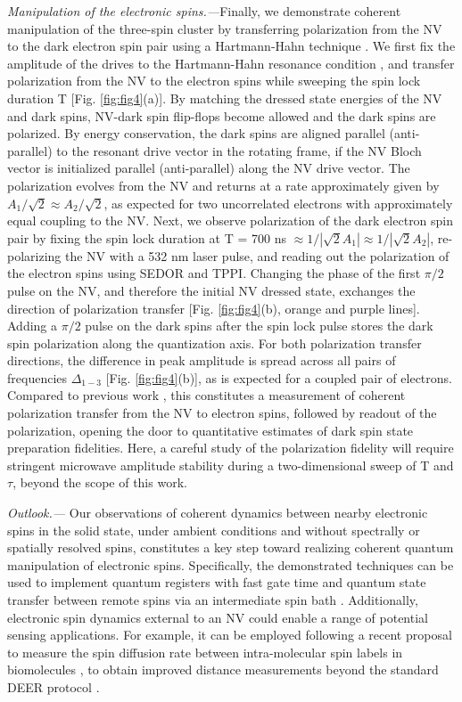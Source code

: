 \documentclass[%
 reprint,
 amsmath,amssymb,
 aps,
]{revtex4-1}
\begin{document}
\textit{Manipulation of the electronic spins.---}Finally, we demonstrate coherent manipulation of the three-spin cluster by transferring polarization from the NV to the dark electron spin pair using a Hartmann-Hahn technique \cite{hartmann hahn}. We first fix the amplitude of the drives to the Hartmann-Hahn resonance condition \cite{hartmann hahn}, and transfer polarization from the NV to the electron spins while sweeping the spin lock duration T [Fig. \ref{fig:fig4}(a)]. By matching the dressed state energies of the NV and dark spins, NV-dark spin flip-flops become allowed and the dark spins are polarized. By energy conservation, the dark spins are aligned parallel (anti-parallel) to the resonant drive vector in the rotating frame, if the NV Bloch vector is initialized parallel (anti-parallel) along the NV drive vector. The polarization evolves from the NV and returns at a rate approximately given by $A_1/\sqrt{2}\approx A_2/\sqrt{2}$, as expected for two uncorrelated electrons with approximately equal coupling to the NV. Next, we observe polarization of the dark electron spin pair by fixing the spin lock duration at T = 700 ns $\approx 1/|\sqrt{2}A_1| \approx 1/|\sqrt{2}A_2|$, re-polarizing the NV with a 532 nm laser pulse, and reading out the polarization of the electron spins using SEDOR and TPPI. Changing the phase of the first $\pi/2$ pulse on the NV, and therefore the initial NV dressed state, exchanges the direction of polarization transfer [Fig. \ref{fig:fig4}(b), orange and purple lines]. Adding a $\pi/2$ pulse on the dark spins after the spin lock pulse stores the dark spin polarization along the quantization axis. For both polarization transfer directions, the difference in peak amplitude is spread across all pairs of frequencies $\Delta_{1-3}$ [Fig. \ref{fig:fig4}(b)], as is expected for a coupled pair of electrons. Compared to previous work \cite{chinmay,helena}, this constitutes a measurement of coherent polarization transfer from the NV to electron spins, followed by readout of the polarization, opening the door to quantitative estimates of dark spin state preparation fidelities. Here, a careful study of the polarization fidelity will require stringent microwave amplitude stability during a two-dimensional sweep of T and $\tau$, beyond the scope of this work. 

\textit{Outlook.---} Our observations of coherent dynamics between nearby electronic spins in the solid state, under ambient conditions and without spectrally or spatially resolved spins, constitutes a key step toward realizing coherent quantum manipulation of electronic spins. Specifically, the demonstrated techniques can be used to implement quantum registers with fast gate time and quantum state transfer between remote spins via an intermediate spin bath \cite{norm,ashok qst,paola NMR,gualdi}. Additionally, electronic spin dynamics external to an NV could enable a range of potential sensing applications. For example, it can be employed following a recent proposal to measure the spin diffusion rate between intra-molecular spin labels in biomolecules \cite{blank spin diffusion,blank flip flop}, to obtain improved distance measurements beyond the standard DEER protocol \cite{DEER, DEER2}. 
\end{document}
